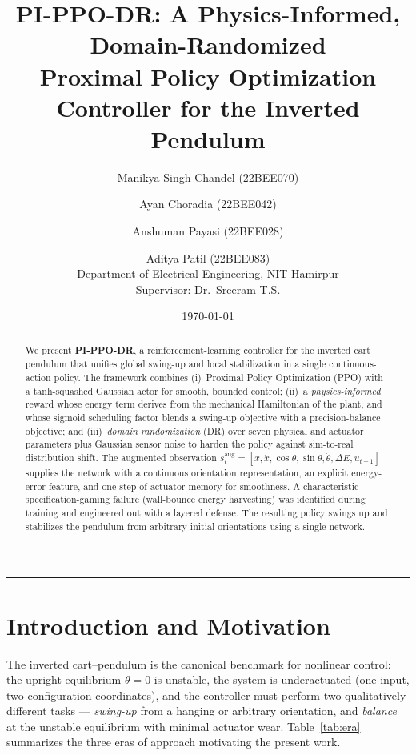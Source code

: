 \documentclass[11pt,a4paper]{article}
\title{\textbf{PI-PPO-DR: A Physics-Informed, Domain-Randomized\\
Proximal Policy Optimization Controller for the Inverted Pendulum}}
\author{%
Manikya Singh Chandel (22BEE070) \and
Ayan Choradia (22BEE042) \and
Anshuman Payasi (22BEE028) \and
Aditya Patil (22BEE083)\\[0.5em]
\small Department of Electrical Engineering, NIT Hamirpur\\
\small Supervisor: Dr.~Sreeram T.S.
}
\date{\today}
\begin{document}
\maketitle

\begin{abstract}
\noindent We present \textbf{PI-PPO-DR}, a reinforcement-learning controller for the inverted cart--pendulum that unifies global swing-up and local stabilization in a single continuous-action policy. The framework combines (i)~Proximal Policy Optimization (PPO) with a tanh-squashed Gaussian actor for smooth, bounded control; (ii)~a \emph{physics-informed} reward whose energy term derives from the mechanical Hamiltonian of the plant, and whose sigmoid scheduling factor blends a swing-up objective with a precision-balance objective; and (iii)~\emph{domain randomization} (DR) over seven physical and actuator parameters plus Gaussian sensor noise to harden the policy against sim-to-real distribution shift. The augmented observation $s^{\text{aug}}_t = [x, \dot{x}, \cos\theta, \sin\theta, \dot\theta, \Delta E, u_{t-1}]$ supplies the network with a continuous orientation representation, an explicit energy-error feature, and one step of actuator memory for smoothness. A characteristic specification-gaming failure (wall-bounce energy harvesting) was identified during training and engineered out with a layered defense. The resulting policy swings up and stabilizes the pendulum from arbitrary initial orientations using a single network.
\end{abstract}

\tableofcontents
\vspace{1em}
\hrule
\vspace{1em}

\section{Introduction and Motivation}

The inverted cart--pendulum is the canonical benchmark for nonlinear control:
the upright equilibrium $\theta = 0$ is unstable, the system is underactuated
(one input, two configuration coordinates), and the controller must perform
two qualitatively different tasks --- \emph{swing-up} from a hanging or
arbitrary orientation, and \emph{balance} at the unstable equilibrium with
minimal actuator wear. Table~\ref{tab:era} summarizes the three eras of
approach motivating the present work.
\end{document}
